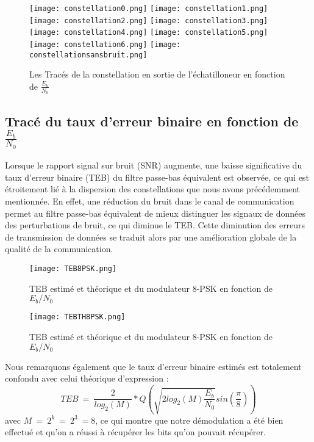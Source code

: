 \documentclass[11pt]{article}
\begin{document}
\begin{figure}[ht!]
    \centering
    \texttt{[image: constellation0.png]}
    \texttt{[image: constellation1.png]}
    \texttt{[image: constellation2.png]}
    \texttt{[image: constellation3.png]}
    \texttt{[image: constellation4.png]}
    \texttt{[image: constellation5.png]}
    \texttt{[image: constellation6.png]}
    \texttt{[image: constellationsansbruit.png]}
    \caption{Les Tracés de la constellation en sortie de l'échatilloneur en fonction de $\frac{E_b}{N_0}$  \label{fig : EnveloppeComplexe}}
\end{figure}
\newpage
\subsection{Tracé du taux d'erreur binaire en fonction de $\frac{E_b}{N_0}$}
Lorsque le rapport signal sur bruit (SNR) augmente, une baisse significative du taux d'erreur binaire (TEB) du filtre passe-bas équivalent est observée, ce qui est étroitement lié à la dispersion des constellations que nous avons précédemment mentionnée. En effet, une réduction du bruit dans le canal de communication permet au filtre passe-bas équivalent de mieux distinguer les signaux de données des perturbations de bruit, ce qui diminue le TEB. Cette diminution des erreurs de transmission de données se traduit alors par une amélioration globale de la qualité de la communication.

\begin{figure}[ht!]
    \centering
    \texttt{[image: TEB8PSK.png]}
    \caption{TEB estimé et théorique et du modulateur 8-PSK en fonction de $E_b/N_0$  \label{fig : TEB8PSK}}
\end{figure}

\begin{figure}[ht!]
    \centering
    \texttt{[image: TEBTH8PSK.png]}
    \caption{TEB estimé et théorique et du modulateur 8-PSK en fonction de $E_b/N_0$  \label{fig : TEB8PSK}}
\end{figure}

Nous remarquons également que le taux d'erreur binaire estimés est totalement confondu avec celui théorique d'expression :
$$TEB \ = \ \frac{2}{log_2(M)}*Q(\sqrt{2log_2(M)\frac{E_b}{N_0}}sin(\frac{\pi}{8}))$$
avec $M \ = \ 2^k \ = \ 2^3 \ = 8$, ce qui montre que notre démodulation a été bien effectué et qu'on a réussi à récupérer les bits qu'on pouvait récupérer.
\end{document}
